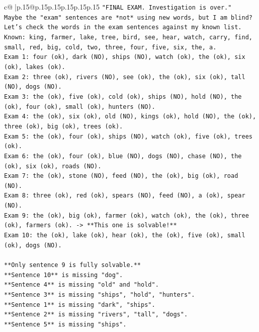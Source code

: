 \documentclass{article}
\begin{document}
{\begin{supertabular}{c@{$\;$}|p{.15\linewidth}@{}p{.15\linewidth}p{.15\linewidth}p{.15\linewidth}p{.15\linewidth}p{.15\linewidth}}
{{{\texttt{"FINAL EXAM. Investigation is over."} \\
\texttt{Maybe the "exam" sentences are *not* using new words, but I am blind?} \\
\texttt{Let's check the words in the exam sentences against my known list.} \\
\texttt{Known: king, farmer, lake, tree, bird, see, hear, watch, carry, find, small, red, big, cold, two, three, four, five, six, the, a.} \\
\texttt{Exam 1: four (ok), dark (NO), ships (NO), watch (ok), the (ok), six (ok), lakes (ok).} \\
\texttt{Exam 2: three (ok), rivers (NO), see (ok), the (ok), six (ok), tall (NO), dogs (NO).} \\
\texttt{Exam 3: the (ok), five (ok), cold (ok), ships (NO), hold (NO), the (ok), four (ok), small (ok), hunters (NO).} \\
\texttt{Exam 4: the (ok), six (ok), old (NO), kings (ok), hold (NO), the (ok), three (ok), big (ok), trees (ok).} \\
\texttt{Exam 5: the (ok), four (ok), ships (NO), watch (ok), five (ok), trees (ok).} \\
\texttt{Exam 6: the (ok), four (ok), blue (NO), dogs (NO), chase (NO), the (ok), six (ok), roads (NO).} \\
\texttt{Exam 7: the (ok), stone (NO), feed (NO), the (ok), big (ok), road (NO).} \\
\texttt{Exam 8: three (ok), red (ok), spears (NO), feed (NO), a (ok), spear (NO).} \\
\texttt{Exam 9: the (ok), big (ok), farmer (ok), watch (ok), the (ok), three (ok), farmers (ok). {-}> **This one is solvable!**} \\
\texttt{Exam 10: the (ok), lake (ok), hear (ok), the (ok), five (ok), small (ok), dogs (NO).} \\
\\ 
\texttt{**Only sentence 9 is fully solvable.**} \\
\texttt{**Sentence 10** is missing "dog".} \\
\texttt{**Sentence 4** is missing "old" and "hold".} \\
\texttt{**Sentence 3** is missing "ships", "hold", "hunters".} \\
\texttt{**Sentence 1** is missing "dark", "ships".} \\
\texttt{**Sentence 2** is missing "rivers", "tall", "dogs".} \\
\texttt{**Sentence 5** is missing "ships".} \\
}}}
\end{supertabular}}
\end{document}
